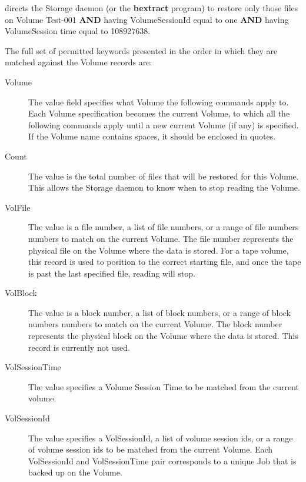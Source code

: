 directs the Storage daemon (or the {\bf bextract} program) to restore only
those files on Volume Test-001 {\bf AND} having VolumeSessionId equal to one
{\bf AND} having VolumeSession time equal to 108927638. 

The full set of permitted keywords presented in the order in which they are
matched against the Volume records are: 

\begin{description}

\item [Volume]
   The value field specifies what Volume the  following commands apply to.  Each
Volume specification becomes the current  Volume, to which all the following
commands apply until  a new current Volume (if any) is specified. If the
Volume name  contains spaces, it should be enclosed in quotes. 

\item [Count]
   The value is the total number of files that  will be restored for this Volume.
This allows the Storage  daemon to know when to stop reading the Volume.  

\item [VolFile]
   The value is a file number, a list of file numbers,  or a range of file
numbers numbers to match on the current Volume.  The file number represents
the physical file on the Volume where  the data is stored. For a tape volume,
this record is used  to position to the correct starting file, and once the
tape is  past the last specified file, reading will stop. 

\item [VolBlock]
   The value is a block number, a list of block numbers,  or a range of block
numbers numbers to match on the current Volume.  The block number represents
the physical block on the Volume where  the data is stored. This record is
currently not used.  

\item [VolSessionTime]
   The value specifies a Volume Session Time to  be matched from the current
volume.  

\item [VolSessionId]
   The value specifies a VolSessionId, a list of  volume session ids, or a range
of volume session ids to be matched  from the current Volume. Each
VolSessionId and VolSessionTime pair corresponds  to a unique Job that is
backed up on the Volume.  


\end{description}
